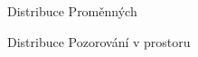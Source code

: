 \documentclass[11pt, a4paper]{article}
\begin{document}
\begin{figure}[ht]
\centering
\noindent{}
\caption{Distribuce Proměnných}
\label{Distribuce Proměných}
\end{figure}

\clearpage

\begin{figure}[ht]
\centering
\noindent{}
\caption{Distribuce Pozorování v prostoru}
\label{Distribuce pozorování v prostoru}
\end{figure}
\end{document}
